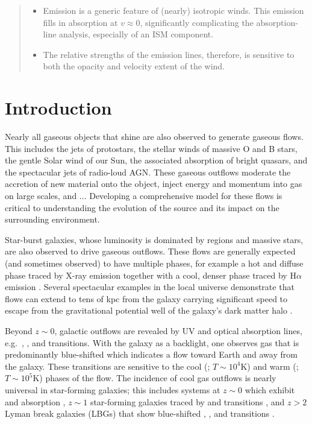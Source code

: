 \documentclass[12pt,preprint]{aastex}
\begin{document}
\begin{abstract}
\begin{itemize}
\item Emission is a generic feature of (nearly) isotropic winds.  This
  emission fills in absorption at $v \approx 0$, significantly
  complicating the absorption-line analysis, especially of an ISM
  component. 
\item The relative strengths of the emission
lines, therefore, is sensitive to both the opacity and velocity
extent of the wind.
\end{itemize}
\end{abstract}


\section{Introduction}

Nearly all gaseous objects that shine are also
observed to generate gaseous flows.  This includes the jets of protostars, the
stellar winds of massive O and B stars, the gentle Solar wind
of our Sun, the associated absorption of bright quasars, and the
spectacular jets of radio-loud AGN.   These gaseous outflows moderate
the accretion of new material onto the object, inject energy and
momentum into gas on large scales, and ...
Developing a comprehensive model for these flows is critical to
understanding the evolution of the source and its impact on the
surrounding environment.

Star-burst galaxies, whose luminosity is dominated by  regions
and massive stars, are also observed to drive gaseous outflows.  These
flows are generally expected (and sometimes observed) to have multiple
phases, for example a hot and diffuse phase traced by X-ray emission
together with a cool, denser phase traced by H$\alpha$ emission 
\citep[e.g.][]{shc+04,km10}. 
Several spectacular
examples in the local universe demonstrate that flows can extend to
tens of kpc from the galaxy \citep{M87} carrying significant speed
to escape from the gravitational potential well of the galaxy's dark
matter halo \citep{wind_escape}.

Beyond $z \sim 0$, galactic outflows are 
revealed by UV and optical absorption lines, e.g.\ ,
,  and  transitions.  With the galaxy
as a backlight, one observes gas that is predominantly
blue-shifted which indicates a flow toward
Earth and away from the galaxy.  These transitions are sensitive to
the cool (; $T \sim 10^4$K) and warm (; $T \sim
10^5$K) phases of the flow.  The incidence of cool gas outflows is
nearly universal in star-forming galaxies;  this includes systems at $z \sim 0$
which exhibit  and  absorption
\citep{rvs05a,martin05,smn+09}, $z \sim 1$ star-forming galaxies traced by
 and  transitions \citep{wcp+09,rwk+10}, and
$z>2$ Lyman break galaxies (LBGs) that show blue-shifted ,
, and  transitions \citep{sgp+96,lkg+97,shapley03}.
\end{document}
